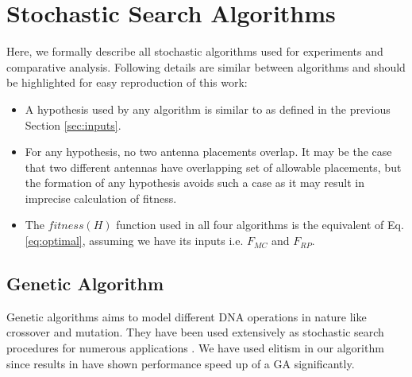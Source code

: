 \documentclass{sig-alternate}
\begin{document}
\section{Stochastic Search Algorithms}
\label{sec:algorithms}
Here, we formally describe all stochastic algorithms used for experiments and comparative analysis. Following details are similar between algorithms and should be highlighted for easy reproduction of this work:
\begin{itemize}
    \item A hypothesis used by any algorithm is similar to as defined in the previous Section \ref{sec:inputs}.
    \item For any hypothesis, no two antenna placements overlap. It may be the case that two different antennas have overlapping set of allowable placements, but the formation of any hypothesis avoids such a case as it may result in imprecise calculation of fitness.
    \item The $fitness(H)$ function used in all four algorithms is the equivalent of Eq.\eqref{eq:optimal}, assuming we have its inputs i.e. $F_{MC}$ and $F_{RP}$.
\end{itemize}
\subsection{Genetic Algorithm}
\label{sec:algorithms-ga}
Genetic algorithms aims to model different DNA operations in nature like crossover and mutation. They have been used extensively as stochastic search procedures for numerous applications \cite{rahmat1999electromagnetic}. We have used elitism in our algorithm since results in \cite{zitzler2000comparison, rudolph2001evolutionary} have shown performance speed up of a GA significantly. 
\end{document}
